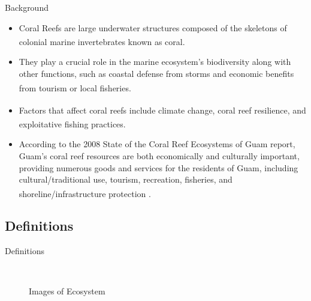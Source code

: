 \documentclass{beamer}
\begin{document}
\begin{frame}{Background}
    \begin{itemize}
        \item<1-> Coral Reefs are large underwater structures composed of the skeletons of colonial marine invertebrates known as coral\textsuperscript{\cite{ross}}.
         \item<2-> They play a crucial role in the marine ecosystem's biodiversity along with other functions, such as coastal defense from storms and economic benefits from tourism or local fisheries\textsuperscript{\cite{04_mathanalysis}}.
         \item<3->  Factors that affect coral reefs include climate change, coral reef resilience\textsuperscript{\cite{02_Riegl_Purkis_Model}}, and exploitative fishing practices\textsuperscript{\cite{05_quintero_machuca_cotto_bradley_ríos-soto_2016}}.
         \item<4-> According to the 2008 State of the Coral Reef Ecosystems of Guam report, Guam’s coral reef resources are both economically and culturally important, providing numerous goods and services for the residents of Guam, including cultural/traditional use, tourism, recreation, fisheries, and shoreline/infrastructure protection \textsuperscript{\cite{guamwebsite}}.
    \end{itemize}
\end{frame}

\subsection{Definitions}
\begin{frame}{Definitions}
    \begin{figure}%
        \centering
        \\
        \qquad
        \caption{Images of Ecosystem}%
        \label{fig:graphs}%
    \end{figure}
\end{frame}
\end{document}
